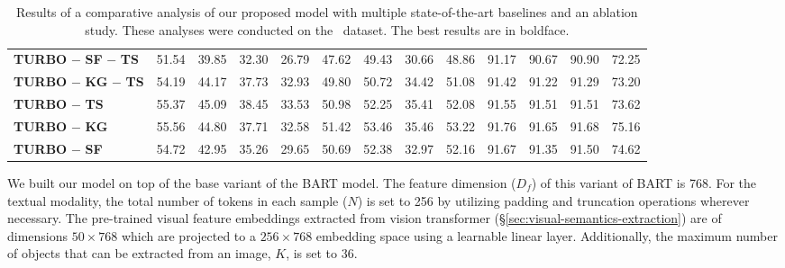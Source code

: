 \begin{table*}
{\begin{tabular}{lcccccccccccc}
    \textbf{TURBO} $-$ \textbf{SF} $-$ \textbf{TS} & 51.54 & 39.85 & 32.30 & 26.79 & 47.62 & 49.43 & 30.66 & 48.86 & 91.17 &	90.67 &	90.90 & 72.25\\
    \textbf{TURBO} $-$ \textbf{KG} $-$ \textbf{TS} & 54.19 & 44.17 & 37.73 & 32.93 & 49.80 & 50.72 & 34.42 & 51.08 & 91.42 & 91.22 & 91.29 & 73.20\\
    \textbf{TURBO} $-$ \textbf{TS} & 55.37 & 45.09 & 38.45 & 33.53 & 50.98 & 52.25 & 35.41 & 52.08 & 91.55 &	91.51 &	91.51 & 73.62\\
    \textbf{TURBO} $-$ \textbf{KG} & 55.56 & 44.80 & 37.71 & 32.58 & 51.42 & 53.46 & 35.46 & 53.22 & 91.76 &	91.65 &	91.68 & 75.16\\
    \textbf{TURBO} $-$ \textbf{SF} & 54.72 & 42.95 & 35.26 & 29.65 & 50.69 & 52.38 & 32.97 & 52.16 & 91.67 & 91.35 & 91.50 & 74.62\\  \bottomrule
  \end{tabular}}
  \caption{Results of a comparative analysis of our proposed model with multiple state-of-the-art baselines and an ablation study. These analyses were conducted on the \dataset\ dataset. The best results are in boldface.}
  \label{comparative-analysis}
\end{table*}

We built our model on top of the base variant of the BART model. The feature dimension ($D_f$) of this variant of BART is 768. For the textual modality, the total number of tokens in each sample ($N$) is set to 256 by utilizing padding and truncation operations wherever necessary. The pre-trained visual feature embeddings extracted from vision transformer (\S \ref{sec:visual-semantics-extraction}) are of dimensions $50 \times 768$ which are projected to a $256 \times 768$ embedding space using a learnable linear layer. Additionally, the maximum number of objects that can be extracted from an image, $K$, is set to 36.

